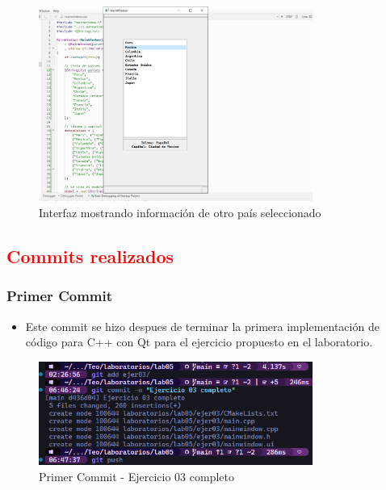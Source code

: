 \begin{figure}[H]
    \centering
    \includegraphics[width=0.8\textwidth]{img/Prueba04.jpg}
    \caption{Interfaz mostrando información de otro país seleccionado}
\end{figure}



\subsection {\textcolor{red}{Commits realizados}}

\subsubsection {Primer Commit}

\begin{itemize}
    \item Este commit se hizo despues de terminar la primera implementación de código para C++ con Qt para el ejercicio propuesto en el laboratorio. 
\end{itemize}

\begin{figure}[H]
    \centering
    \includegraphics[width=0.8\textwidth]{img/Commit01.png}
    \caption{Primer Commit - Ejercicio 03 completo}
    \label{fig:commit1}
\end{figure}




